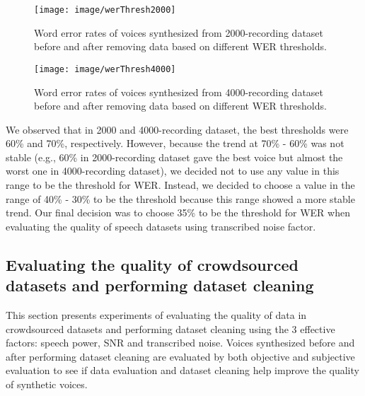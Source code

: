 \documentclass[12pt]{article}
\begin{document}
\begin{figure}[t]
\begin{center}
\texttt{[image: image/werThresh2000]}
\end{center}
\vspace{-0.3cm}
\caption[Word error rates of voices synthesized from 2000-recording dataset before and after removing data based on different WER thresholds.]{Word error rates of voices synthesized from 2000-recording dataset before and after removing data based on different WER thresholds.}
\label{fig_werThresh2000}
\end{figure}

\begin{figure}[t]
\begin{center}
\texttt{[image: image/werThresh4000]}
\end{center}
\vspace{-0.3cm}
\caption[Word error rates of voices synthesized from 4000-recording dataset before and after removing data based on different WER thresholds.]{Word error rates of voices synthesized from 4000-recording dataset before and after removing data based on different WER thresholds.}
\label{fig_werThresh4000}
\end{figure}

We observed that in 2000 and 4000-recording dataset, the best thresholds were 60\% and 70\%, respectively. However, because the trend at 70\% - 60\% was not stable (e.g., 60\% in 2000-recording dataset gave the best voice but almost the worst one in 4000-recording dataset), we decided not to use any value in this range to be the threshold for WER.  Instead, we decided to choose a value in the range of 40\% - 30\% to be the threshold because this range showed a more stable trend. Our final decision was to choose 35\% to be the threshold for WER when evaluating the quality of speech datasets using transcribed noise factor.

\subsection{Evaluating the quality of crowdsourced datasets and performing dataset cleaning}
This section presents experiments of evaluating the quality of data in crowdsourced datasets and performing dataset cleaning using the 3 effective factors: speech power, SNR and transcribed noise. Voices synthesized before and after performing dataset cleaning are evaluated by both objective and subjective evaluation to see if data evaluation and dataset cleaning help improve the quality of synthetic voices.
\end{document}
